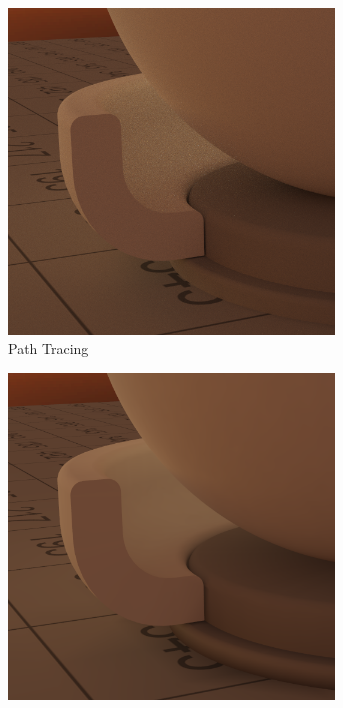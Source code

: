 		\begin{figure}[h]
			\begin{subfigure}[t]{0.33\textwidth}
				\center
				\includegraphics[width=0.95\textwidth]{pic/irr_est-ra-shaderball2-ref.png}
				\caption{Path Tracing}
			\end{subfigure}
			\begin{subfigure}[t]{0.33\textwidth}
				\center
				\includegraphics[width=0.95\textwidth]{pic/irr_est-ra-shaderball2-irr.png}

\end{subfigure}
\end{figure}
